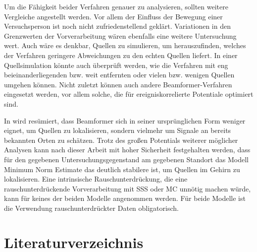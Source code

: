 \documentclass[doc,a4paper,12pt]{apa6}
\begin{document}
Um die Fähigkeit beider Verfahren genauer zu analysieren, sollten weitere Vergleiche angestellt werden. Vor allem der Einfluss der Bewegung einer Versuchsperson ist noch nicht zufriedenstellend geklärt. Variationen in den Grenzwerten der Vorverarbeitung wären ebenfalls eine weitere Untersuchung wert. Auch wäre es denkbar, Quellen zu simulieren, um herauszufinden, welches der Verfahren geringere Abweichungen zu den echten Quellen liefert. In einer Quellsimulation könnte auch überprüft werden, wie die Verfahren mit eng beieinanderliegenden bzw. weit entfernten oder vielen bzw. wenigen Quellen umgehen können. Nicht zuletzt können auch andere Beamformer-Verfahren eingesetzt werden, vor allem solche, die für ereigniskorrelierte Potentiale optimiert sind.

In \textcite{hansen2010meg} wird resümiert, dass Beamformer sich in seiner ursprünglichen Form weniger eignet, um Quellen zu lokalisieren, sondern vielmehr um Signale an bereits bekannten Orten zu schätzen. Trotz des großen Potentials weiterer möglicher Analysen kann nach dieser Arbeit mit hoher Sicherheit festgehalten werden, dass für den gegebenen Untersuchungsgegenstand am gegebenen Standort das Modell Minimum Norm Estimate das deutlich stabilere ist, um Quellen im Gehirn zu lokalisieren. Eine intrinsische Rauschunterdrückung, die eine rauschunterdrückende Vorverarbeitung mit SSS oder MC unnötig machen würde, kann für keines der beiden Modelle angenommen werden. Für beide Modelle ist die Verwendung rauschunterdrückter Daten obligatorisch.

\newpage
\section{Literaturverzeichnis}

\printbibliography[heading=none]

%
\end{document}
